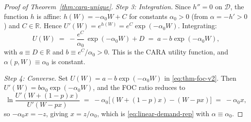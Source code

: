 \documentclass[12pt,letterpaper]{article}
\theoremstyle{definition}
\theoremstyle{remark}
\newcommand{\R}{\mathbb{R}}
\newcommand{\1}{\mathbf{1}}
\begin{document}
\begin{proof}[Proof of Theorem~\ref{thm:cara-unique}]
\emph{Step 3: Integration.} Since $h''=0$ on $\mathcal{D}$, the function
$h$ is affine: $h(W)=-\alpha_{0}W+C$ for constants $\alpha_{0}>0$ (from
$\alpha=-h'>0$) and $C\in\R$.
Hence $U'(W)=e^{h(W)}=e^{C}\exp(-\alpha_{0}W)$. Integrating:
\[
   U(W) \;=\; -\frac{e^{C}}{\alpha_{0}}\,\exp(-\alpha_{0}W) + D
   \;=\; a - b\exp(-\alpha_{0}W),
\]
with $a\equiv D\in\R$ and $b\equiv e^{C}/\alpha_{0}>0$. This is the CARA
utility function, and $\alpha(p,W)\equiv\alpha_{0}$ is constant.

\emph{Step 4: Converse.} Set $U(W)=a-b\exp(-\alpha_{0}W)$ in
\eqref{eq:thm-foc-v2}. Then
$U'(W)=b\alpha_{0}\exp(-\alpha_{0}W)$, and the FOC ratio reduces to
\[
   \ln\frac{U'(W+(1-p)x)}{U'(W-px)}
   \;=\; -\alpha_{0}\bigl[(W+(1-p)x)-(W-px)\bigr]
   \;=\; -\alpha_{0}x,
\]
so $-\alpha_{0}x = -z$, giving $x=z/\alpha_{0}$, which is
\eqref{eq:linear-demand-rep} with $\alpha\equiv\alpha_{0}$.
\end{proof}
\end{document}
